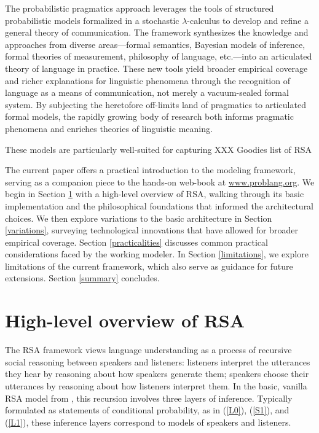\documentclass{sp}
\begin{document}
The probabilistic pragmatics approach leverages the tools of structured probabilistic models formalized in a stochastic $\lambda$-calculus to develop and refine a general theory of communication. The framework synthesizes the knowledge and approaches from diverse areas---formal semantics, Bayesian models of inference, formal theories of measurement, philosophy of language, etc.---into an articulated theory of language in practice. These new tools yield broader empirical coverage and richer explanations for linguistic phenomena through the recognition of language as a means of communication, not merely a vacuum-sealed formal system. By subjecting the heretofore off-limits land of pragmatics to articulated formal models, the rapidly growing body of research both informs pragmatic phenomena and enriches theories of linguistic meaning.

These models are particularly well-suited for capturing XXX Goodies list of RSA

The current paper offers a practical introduction to the modeling framework, serving as a companion piece to the hands-on web-book at \href{https://www.problang.org}{www.problang.org}. We begin in Section \ref{overview} with a high-level overview of RSA, walking through its basic implementation and the philosophical foundations that informed the architectural choices. We then explore variations to the basic architecture in Section \ref{variations}, surveying technological innovations that have allowed for broader empirical coverage. Section \ref{practicalities} discusses common practical considerations faced by the working modeler. In Section \ref{limitations}, we explore limitations of the current framework, which also serve as guidance for future extensions. Section \ref{summary} concludes.


\section{High-level overview of RSA} \label{overview}

The RSA framework views language understanding as a process of recursive social reasoning between speakers and listeners: listeners interpret the utterances they hear by reasoning about how speakers generate them; speakers choose their utterances by reasoning about how listeners interpret them. In the basic, vanilla RSA model from \cite{frankgoodman2012}, this recursion involves three layers of inference. Typically formulated as statements of conditional probability, as in (\ref{L0}), (\ref{S1}), and (\ref{L1}), these inference layers correspond to models of speakers and listeners.
\end{document}
